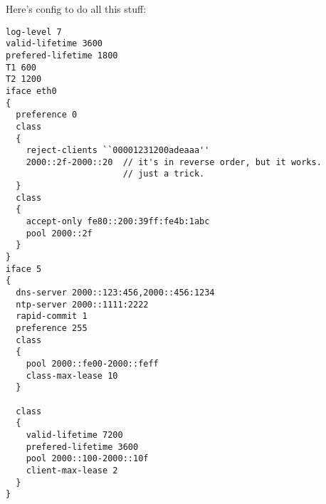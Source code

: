 Here's config to do all this stuff:

\begin{verbatim}
log-level 7
valid-lifetime 3600
prefered-lifetime 1800
T1 600
T2 1200
iface eth0
{
  preference 0
  class
  {
    reject-clients ``00001231200adeaaa''
    2000::2f-2000::20  // it's in reverse order, but it works.
                       // just a trick. 
  }
  class
  {
    accept-only fe80::200:39ff:fe4b:1abc
    pool 2000::2f 
  }
}
iface 5
{
  dns-server 2000::123:456,2000::456:1234
  ntp-server 2000::1111:2222
  rapid-commit 1
  preference 255
  class
  {
    pool 2000::fe00-2000::feff
    class-max-lease 10
  }
  
  class
  {
    valid-lifetime 7200
    prefered-lifetime 3600
    pool 2000::100-2000::10f
    client-max-lease 2
  } 
}
\end{verbatim}

